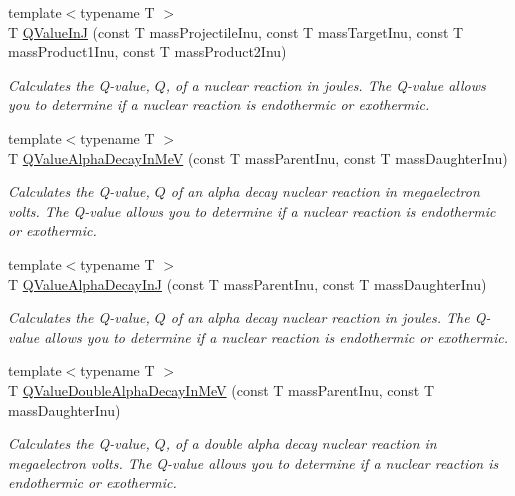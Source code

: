 \begin{DoxyCompactItemize}
{\footnotesize template$<$typename T $>$ }\\T \mbox{\hyperlink{group___e_g_x_phys-_q_value_ga4b23be4fb0a3a9e7229c95377afc74b5}{Q\+Value\+InJ}} (const T mass\+Projectile\+Inu, const T mass\+Target\+Inu, const T mass\+Product1\+Inu, const T mass\+Product2\+Inu)
\begin{DoxyCompactList}\small\item\em Calculates the Q-\/value, $Q$, of a nuclear reaction in joules. The Q-\/value allows you to determine if a nuclear reaction is endothermic or exothermic. \end{DoxyCompactList}\item 
{\footnotesize template$<$typename T $>$ }\\T \mbox{\hyperlink{group___e_g_x_phys-_q_value-_alpha_ga4f9a38d3ad4bf93471a0affb493b6e72}{Q\+Value\+Alpha\+Decay\+In\+MeV}} (const T mass\+Parent\+Inu, const T mass\+Daughter\+Inu)
\begin{DoxyCompactList}\small\item\em Calculates the Q-\/value, $Q$ of an alpha decay nuclear reaction in megaelectron volts. The Q-\/value allows you to determine if a nuclear reaction is endothermic or exothermic. \end{DoxyCompactList}\item 
{\footnotesize template$<$typename T $>$ }\\T \mbox{\hyperlink{group___e_g_x_phys-_q_value-_alpha_gab8a50c18f6de3c1b6ed280c26c3ff3a5}{Q\+Value\+Alpha\+Decay\+InJ}} (const T mass\+Parent\+Inu, const T mass\+Daughter\+Inu)
\begin{DoxyCompactList}\small\item\em Calculates the Q-\/value, $Q$ of an alpha decay nuclear reaction in joules. The Q-\/value allows you to determine if a nuclear reaction is endothermic or exothermic. \end{DoxyCompactList}\item 
{\footnotesize template$<$typename T $>$ }\\T \mbox{\hyperlink{group___e_g_x_phys-_q_value-_alpha_ga85230c793adc7fc78fef760874f75ad9}{Q\+Value\+Double\+Alpha\+Decay\+In\+MeV}} (const T mass\+Parent\+Inu, const T mass\+Daughter\+Inu)
\begin{DoxyCompactList}\small\item\em Calculates the Q-\/value, $Q$, of a double alpha decay nuclear reaction in megaelectron volts. The Q-\/value allows you to determine if a nuclear reaction is endothermic or exothermic. \end{DoxyCompactList}\item 

\end{DoxyCompactItemize}

